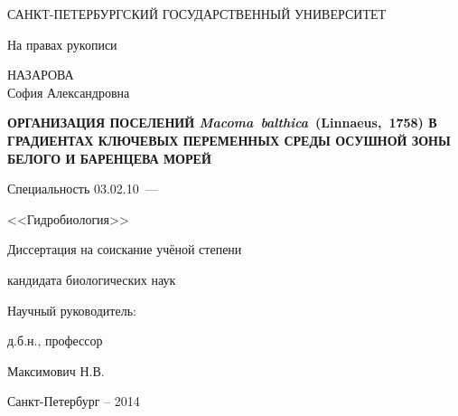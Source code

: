 \thispagestyle{empty}

\begin{center}
САНКТ-ПЕТЕРБУРГСКИЙ ГОСУДАРСТВЕННЫЙ УНИВЕРСИТЕТ\par
\par
\end{center}

\vspace{20mm}
\begin{flushright}
На правах рукописи

\end{flushright}

\vspace{30mm}
\begin{center}
{\large НАЗАРОВА\\ София Александровна}
\end{center}

\vspace{5mm}
\begin{center}
{\bfseries \large ОРГАНИЗАЦИЯ ПОСЕЛЕНИЙ {\itshape Macoma~balthica}~(Linnaeus,~1758) В ГРАДИЕНТАХ КЛЮЧЕВЫХ ПЕРЕМЕННЫХ СРЕДЫ ОСУШНОЙ ЗОНЫ БЕЛОГО И БАРЕНЦЕВА МОРЕЙ
\par}

\vspace{10mm}
{%
Специальность 03.02.10~---

<<Гидробиология>>
}

\vspace{10mm}
Диссертация на соискание учёной степени

кандидата биологических наук
\end{center}

\vspace{20mm}
\begin{flushright}
Научный руководитель:

д.б.н., профессор

Максимович Н.В.

\end{flushright}

\vspace{20mm}
\begin{center}
{Санкт-Петербург  -- 2014}
\end{center}

\newpage
